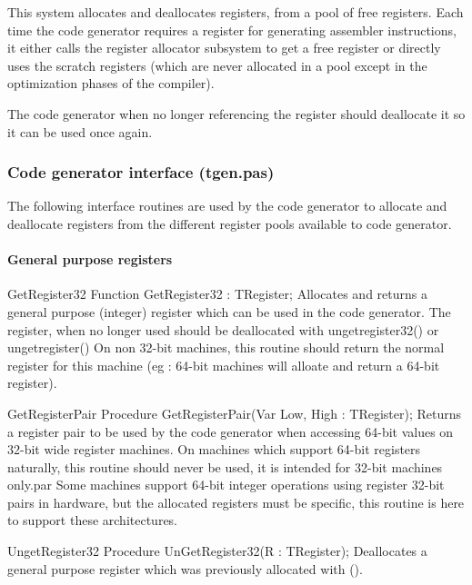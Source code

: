 \documentclass [a4paper,12pt]{article}
\begin{document}
This system allocates and deallocates registers, from a pool of free
registers. Each time the code generator requires a register for generating
assembler instructions, it either calls the register allocator subsystem to
get a free register or directly uses the scratch registers (which are never
allocated in a pool except in the optimization phases of the compiler).

The code generator when no longer referencing the register should deallocate
it so it can be used once again.

\subsubsection{Code generator interface (tgen.pas)}
\label{subsubsec:mylabel29}

The following interface routines are used by the code generator to allocate
and deallocate registers from the different register pools available to code
generator.

\paragraph{General purpose registers}

\begin{function}{GetRegister32}
\Declaration
Function GetRegister32 : TRegister;
\Description
Allocates and returns a general purpose (integer) register which can be used
in the code generator. The register, when no longer used should be
deallocated with ungetregister32() or ungetregister()
\Notes
On non 32-bit machines, this routine should return the normal register for
this machine (eg : 64-bit machines will alloate and return a 64-bit
register).
\end{function}

\begin{procedure}{GetRegisterPair}
\Declaration
Procedure GetRegisterPair(Var Low, High : TRegister);
\Description
Returns a register pair to be used by the code generator when accessing
64-bit values on 32-bit wide register machines.
\Notes
On machines which support 64-bit registers naturally, this routine should
never be used, it is intended for 32-bit machines only.par Some machines
support 64-bit integer operations using register 32-bit pairs in hardware,
but the allocated registers must be specific, this routine is here to
support these architectures.
\end{procedure}

\begin{procedure}{UngetRegister32}
\Declaration
Procedure UnGetRegister32(R : TRegister);
\Description
Deallocates a general purpose register which was previously allocated with
().
\end{procedure}
\end{document}
